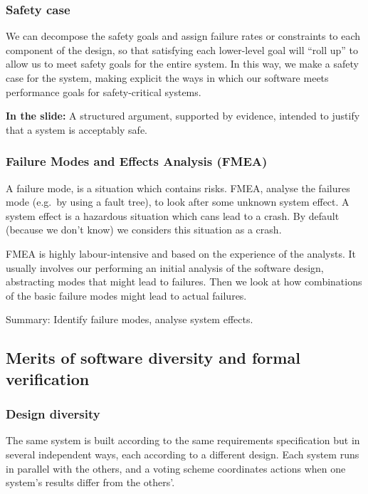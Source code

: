 \subsubsection{Safety case}

We can decompose the safety goals and assign failure rates or
constraints to each component of the design, so that satisfying each
lower-level goal will “roll up” to allow us to meet safety goals for the
entire system. In this way, we make a safety case for the system, making
explicit the ways in which our software meets performance goals for
safety-critical systems. \newline

\textbf{In the slide:} A structured argument, supported by evidence, intended to justify that a system is 
acceptably safe. \newline

\subsubsection{Failure Modes and Effects Analysis (FMEA)}

A failure mode, is a situation which contains risks. FMEA, analyse the
failures mode (e.g.\ by using a fault tree), to look after some unknown
system effect. A system effect is a hazardous situation which cans lead
to a crash. By default (because we don’t know) we considers this
situation as a crash. \newline

FMEA is highly labour-intensive and based on the experience of the
analysts. It usually involves our performing an initial analysis of the
software design, abstracting modes that might lead to failures. Then we
look at how combinations of the basic failure modes might lead to actual
failures. \newline

Summary: Identify failure modes, analyse system effects.

\subsection{Merits of software diversity and formal verification}

\subsubsection{Design diversity}

The same system is built according to the same requirements
specification but in several independent ways, each according to a
different design. Each system runs in parallel with the others, and a
voting scheme coordinates actions when one system’s results differ from
the others’. \newline

